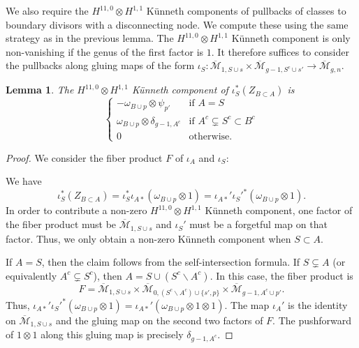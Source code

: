 \documentclass[12pt]{amsart}
\newtheorem{lem}[thm]{Lemma}
\theoremstyle{definition}
\numberwithin{equation}{section}
\newcommand{\M}{\mathcal{M}}
\newcommand{\Mb}{\overline{\M}}
\theoremstyle{definition} %
\theoremstyle{remark}
\begin{document}
We also require the $H^{11,0} \otimes H^{1,1}$ K\"unneth components of pullbacks of classes to boundary divisors with a disconnecting node. We compute these using the same strategy as in the previous lemma. 
The $H^{11, 0} \otimes H^{1,1}$ K\"unneth component is only non-vanishing if the genus of the first factor is $1$.
It therefore suffices to consider the pullbacks along gluing maps of the form $\iota_S \colon \Mb_{1, S \cup s} \times \Mb_{g-1, S^c \cup s'} \to \Mb_{g,n}$. 
\begin{lem} \label{ok}
The $H^{11,0} \otimes H^{1,1}$ K\"unneth component of $\iota_S^*(Z_{B \subset A})$ is
\[\begin{cases} -\omega_{B \cup p} \otimes \psi_{p'} & \text{if $A = S$} \\
\omega_{B \cup p} \otimes \delta_{g-1,A^c} & \text{if $A^c \subsetneq S^c \subset B^c$} \\
 0 & \text{otherwise.}\end{cases} \]
\end{lem}
\begin{proof}
We consider the fiber product $F$ of $\iota_A$ and $\iota_S$:
\begin{center}
\end{center}
We have
\[\iota_S^*(Z_{B \subset A}) = \iota_S^*\iota_{A*}(\omega_{B \cup p} \otimes 1) = \iota_{A*}' \iota_S'^*(\omega_{B \cup p} \otimes 1).\]
In order to contribute a non-zero $H^{11,0} \otimes H^{1,1}$ K\"unneth component, one factor of the fiber product must be $\Mb_{1,S \cup s}$ and $\iota_S'$ must be a forgetful map on that factor. Thus, we only obtain a non-zero K\"unneth component when $S \subset A$.

If $A = S$, then the claim follows from the self-intersection formula. If $S \subsetneq A$ (or equivalently $A^c \subsetneq S^c$), then $A = S \cup (S^c \smallsetminus A^c)$.
In this case, the fiber product is
\[F = \Mb_{1, S \cup s} \times \Mb_{0, (S^c \smallsetminus A^c) \cup \{s',p\}} \times \Mb_{g-1, A^c \cup p'}.\]
Thus, $\iota_{A*}' \iota_S'^*(\omega_{B \cup p} \otimes 1) = \iota_{A*}'(\omega_{B \cup p} \otimes 1 \otimes 1)$. The map $\iota_{A}'$ is the identity on $\Mb_{1,S \cup s}$ and the gluing map on the second two factors of $F$. The pushforward of $1 \otimes 1$ along this gluing map is precisely $\delta_{g-1,A^c}$. 
\end{proof}
\end{document}
